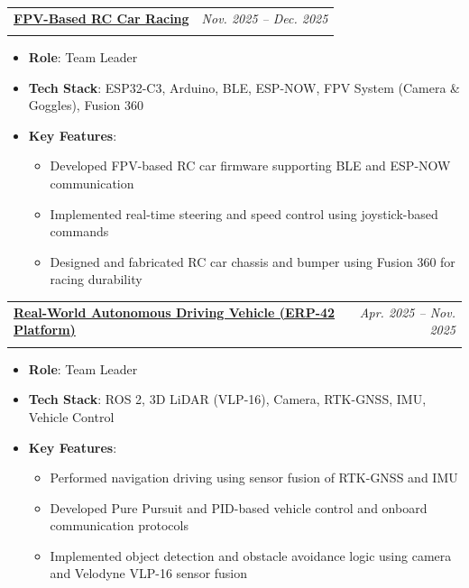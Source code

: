 \documentclass[a4paper,11pt]{article}
\makeatletter
\newcommand{\resumeProject}[4]{%
\item
    \begin{tabular*}{0.98\textwidth}[t]{l@{\extracolsep{\fill}}r}
        \textbf{#1} & \textit{\footnotesize{#3}} \\
        \footnotesize{\textit{#2}} & \footnotesize{#4}
    \end{tabular*}
}
\newcommand{\resumeItemListStart}{\begin{itemize}}
\newcommand{\resumeItemListEnd}{\end{itemize}}
\makeatother
\begin{document}
\vspace{0.5em}

\resumeProject
{\href{https://github.com/EliseEgkart/iPBL_FPV_car_project}{FPV-Based RC Car Racing}}
{}
{Nov. 2025 -- Dec. 2025}
{}
\vspace{-1.5em}
\resumeItemListStart
  \item \textbf{Role}: Team Leader
  \item \textbf{Tech Stack}: ESP32-C3, Arduino, BLE, ESP-NOW, FPV System (Camera \& Goggles), Fusion 360
  \item \textbf{Key Features}:
  \begin{itemize}[leftmargin=1.2em]
    \item Developed FPV-based RC car firmware supporting BLE and ESP-NOW communication
    \item Implemented real-time steering and speed control using joystick-based commands
    \item Designed and fabricated RC car chassis and bumper using Fusion 360 for racing durability
  \end{itemize}
\resumeItemListEnd

\vspace{0.5em}

\resumeProject
{\href{https://github.com/UNITA2025}{Real-World Autonomous Driving Vehicle (ERP-42 Platform)}}
{}
{Apr. 2025 -- Nov. 2025}
{}
\vspace{-1.5em}
\resumeItemListStart
  \item \textbf{Role}: Team Leader
  \item \textbf{Tech Stack}: ROS 2, 3D LiDAR (VLP-16), Camera, RTK-GNSS, IMU, Vehicle Control
  \item \textbf{Key Features}:
  \begin{itemize}[leftmargin=1.2em]
    \item Performed navigation driving using sensor fusion of RTK-GNSS and IMU
    \item Developed Pure Pursuit and PID-based vehicle control and onboard communication protocols
    \item Implemented object detection and obstacle avoidance logic using camera and Velodyne VLP-16 sensor fusion
  \end{itemize}
\resumeItemListEnd
\end{document}
